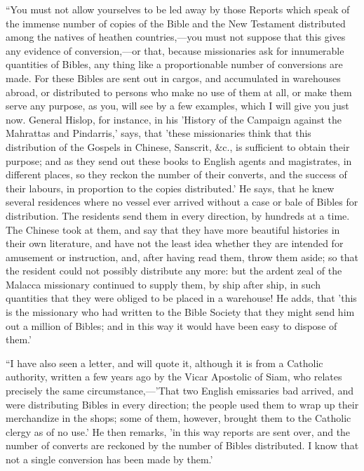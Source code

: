 ``You
must not allow yourselves to be led away by those Reports which speak of
the immense number of copies of the Bible and the New Testament
distributed among the natives of heathen countries,—you must not
suppose that this gives any evidence of conversion,—or that, because
missionaries ask for innumerable quantities of Bibles, any thing like a
proportionable number of conversions are made. For these Bibles are sent
out in cargos, and accumulated in warehouses abroad, or distributed to
persons who make no use of them at all, or make them serve any purpose,
as you, will see by a few examples, which I will give you just now.
General Hislop, for instance, in his 'History of the Campaign against
the Mahrattas and Pindarris,' says, that 'these missionaries think that
this distribution of the Gospels in Chinese, Sanscrit, \&c., is
sufficient to obtain their purpose; and as they send out these books to
English agents and magistrates, in different places, so they reckon the
number of their converts, and the success of their labours, in
proportion to the copies distributed.' He says, that he knew several
residences where no vessel ever arrived without a case or bale of Bibles
for distribution. The residents send them in every direction, by
hundreds at a time. The Chinese took at them, and say that they have
more beautiful histories in their own literature, and have not the least
idea whether they are intended for amusement or instruction, and, after
having read them, throw them aside; so that the resident could not
possibly distribute any more: but the ardent zeal of the Malacca
missionary continued to supply them, by ship after ship, in such
quantities that they were obliged to be placed in a warehouse! He adds,
that 'this is the missionary who had written to the Bible Society that
they might send him out a million of Bibles; and in this way it would
have been easy to dispose of them.'

``I
have also seen a letter, and will quote it, although it is from a
Catholic authority, written a few years ago by the Vicar Apostolic of
Siam, who relates precisely the same circumstance,—'That two English
emissaries bad arrived, and were distributing Bibles in every direction;
the people used them to wrap up their merchandize in the shops; some of
them, however, brought them to the Catholic clergy as of no use.' He
then remarks, 'in this way reports are sent over, and the number of
converts are reckoned by the number of Bibles distributed. I know that
not a single conversion has been made by them.'

